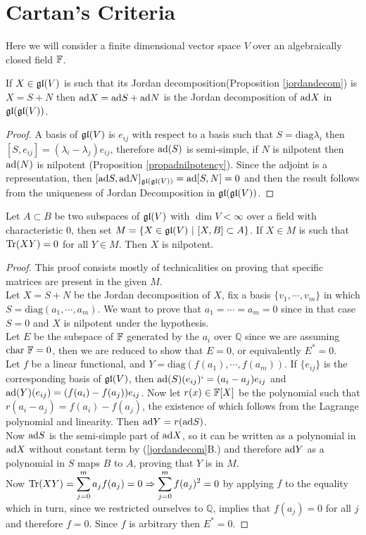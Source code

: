 \section{Cartan's Criteria}
Here we will consider a finite dimensional vector space $V$ over an algebraically closed field $\mathbb{F}$.
\begin{prop}
	If $X \in \mathfrak{gl}(V)$ is such that its Jordan decomposition(Proposition \ref{jordandecom}) is $X=S+N$ then $\text{ad} X = \text{ad} S + \text{ad} N$ is the Jordan decomposition of $\text{ad} X$ in $\mathfrak{gl}(\mathfrak{gl}(V))$.
\end{prop}
\begin{proof}
	A basis of $\mathfrak{gl}(V)$ is $e_{ij}$ with respect to a basis such that $S= \text{diag}{\lambda_i}$ then $[S,e_{ij}]=(\lambda_i-\lambda_j)e_{ij}$, therefore $\text{ad}(S)$ is semi-simple, if $N$ is nilpotent then $\text{ad}(N)$ is nilpotent (Proposition \ref{propadnilpotency}). Since the adjoint is a representation, then $[\text{ad} S,\text{ad} N]_{\mathfrak{gl}(\mathfrak{gl}(V))} = \text{ad}[S,N] = 0$ and then the result follows from the uniqueness of Jordan Decomposition in $\mathfrak{gl}(\mathfrak{gl}(V))$.
\end{proof}
\begin{teo}
	Let $A \subset B$ be two subspaces of $\mathfrak{gl}(V)$ with $\dim V < \infty$ over a field with characteristic $0$, then set $M=\{X \in \mathfrak{gl}(V)\ |\ [X,B]\subset A\}$. If $X \in M$ is such that $\text{Tr}(XY)=0$ for all $Y \in M$. Then $X$ is nilpotent.
	\label{Cartan's Lemma}
\end{teo}
\begin{proof}
	This proof consists mostly of technicalities on proving that specific matrices are present in the given $M$.\\ 
	Let $X=S+N$ be the Jordan decomposition of $X$, fix a basis $\{v_1,\cdots,v_m\}$ in which $S=\text{diag}(a_1,\cdots,a_m)$. We want to prove that $a_1=\cdots=a_m=0$ since in that case $S=0$ and $X$ is nilpotent under the hypothesis.\\
	Let $E$ be the subspace of $\mathbb{F}$ generated by the $a_i$ over $\mathbb{Q}$ since we are assuming $\text{char } \mathbb{F}= 0$, then we are reduced to show that $E=0$, or equivalently $E^*=0$.\\
	Let $f$ be a linear functional, and $Y=\text{diag}(f(a_1),\cdots,f(a_m))$. If $\{e_{ij}\}$ is the corresponding basis of $\mathfrak{gl}(V)$, then $\text{ad}(S)(e_{ij})` = (a_i-a_j)e_{ij}$ and $\text{ad}(Y)(e_{ij}) = (f(a_i)-f(a_j))e_{ij}$. Now let $r(x)\in\mathbb{F}[X]$ be the polynomial such that $r(a_i-a_j)=f(a_i)-f(a_j)$, the existence of which follows from the Lagrange polynomial and linearity. Then $\text{ad} Y = r(\text{ad} S)$.\\
	Now $\text{ad} S$ is the semi-simple part of $\text{ad} X$, so it can be written as a polynomial in $\text{ad} X$ without constant term by (\ref{jordandecom}B.) and therefore $\text{ad} Y$ as a polynomial in $S$ maps $B$ to $A$, proving that $Y$ is in $M$.\\
	Now $\text{Tr}(XY)=\displaystyle\sum_{j=0}^m a_jf(a_j)=0 \Rightarrow \displaystyle\sum_{j=0}^m f(a_j)^2 =0$ by applying $f$ to the equality which in turn, since we restricted ourselves to $\mathbb{Q}$, implies that $f(a_j)=0$ for all $j$ and therefore $f=0$. Since $f$ is arbitrary then $E^*=0$.
\end{proof}	\\
